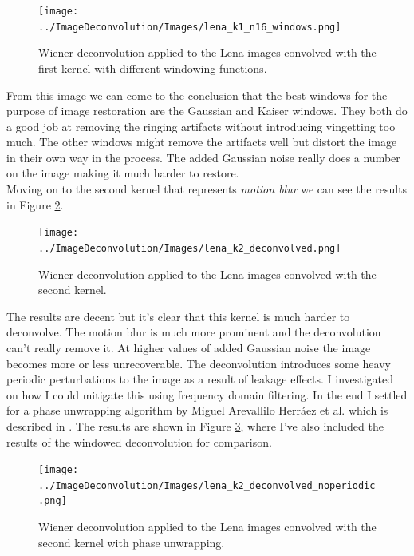 \documentclass[10pt, titlepage, a4paper]{article}
\begin{document}
\begin{figure}[H]
    \centering
    \texttt{[image: ../ImageDeconvolution/Images/lena\_k1\_n16\_windows.png]}
    \caption{Wiener deconvolution applied to the Lena images convolved with the first kernel with different windowing functions.}
    \label{fig:lena-1-windowing}
\end{figure}

From this image we can come to the conclusion that the best windows for the purpose of image restoration are the Gaussian 
and Kaiser windows. They both do a good job at removing the ringing artifacts without introducing vingetting too much. The other 
windows might remove the artifacts well but distort the image in their own way in the process. The added Gaussian noise 
really does a number on the image making it much harder to restore. \\

Moving on to the second kernel that represents \textit{motion blur} we can see the results in Figure \ref{fig:lena-2}.

\begin{figure}[H]
    \centering
    \texttt{[image: ../ImageDeconvolution/Images/lena\_k2\_deconvolved.png]}
    \caption{Wiener deconvolution applied to the Lena images convolved with the second kernel.}
    \label{fig:lena-2}
\end{figure}

The results are decent but it's clear that this kernel is much harder to deconvolve. The motion blur is much more prominent
and the deconvolution can't really remove it. At higher values of added Gaussian noise the image becomes more or less 
unrecoverable. The deconvolution introduces some heavy periodic perturbations to the image as a result of leakage effects.
I investigated on how I could mitigate this using frequency domain filtering. In the end I settled for a phase unwrapping 
algorithm by Miguel Arevallilo Herráez et al. which is described in \cite{unwrap}. The results are shown in Figure
\ref{fig:lena-2-unwrapping}, where I've also included the results of the windowed deconvolution for comparison.

\begin{figure}[H]
    \centering
    \texttt{[image: ../ImageDeconvolution/Images/lena\_k2\_deconvolved\_noperiodic.png]}
    \caption{Wiener deconvolution applied to the Lena images convolved with the second kernel with phase unwrapping.}
    \label{fig:lena-2-unwrapping}
\end{figure}
\end{document}
